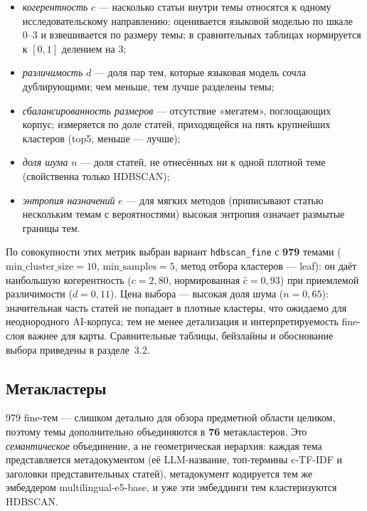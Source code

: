 \begin{itemize}
  \item \emph{когерентность} $c$ — насколько статьи внутри темы относятся к одному
        исследовательскому направлению; оценивается языковой моделью по шкале 0–3 и взвешивается
        по размеру темы; в сравнительных таблицах нормируется к $[0,1]$ делением на 3;
  \item \emph{различимость} $d$ — доля пар тем, которые языковая модель сочла дублирующими; чем
        меньше, тем лучше разделены темы;
  \item \emph{сбалансированность размеров} — отсутствие «мегатем», поглощающих корпус;
        измеряется по доле статей, приходящейся на пять крупнейших кластеров (top5, меньше — лучше);
  \item \emph{доля шума} $n$ — доля статей, не отнесённых ни к одной плотной теме (свойственна
        только HDBSCAN);
  \item \emph{энтропия назначений} $e$ — для мягких методов (приписывают статью нескольким темам
        с вероятностями) высокая энтропия означает размытые границы тем.
\end{itemize}

По совокупности этих метрик выбран вариант \texttt{hdbscan\_fine} с \textbf{979} темами
($\mathrm{min\_cluster\_size} = 10$, $\mathrm{min\_samples} = 5$, метод отбора кластеров — leaf):
он даёт наибольшую когерентность ($c = 2{,}80$, нормированная $\hat{c} = 0{,}93$) при приемлемой
различимости ($d = 0{,}11$). Цена выбора — высокая доля шума ($n = 0{,}65$): значительная часть
статей не попадает в плотные кластеры, что ожидаемо для неоднородного AI-корпуса; тем не менее
детализация и интерпретируемость fine-слоя важнее для карты. Сравнительные таблицы, бейзлайны
и обоснование выбора приведены в разделе~3.2.

\subsection{Метакластеры}
\label{sec:meta}

979 fine-тем — слишком детально для обзора предметной области целиком, поэтому темы дополнительно
объединяются в \textbf{76} метакластеров. Это \emph{семантическое} объединение, а не геометрическая
иерархия: каждая тема представляется метадокументом (её LLM-название, топ-термины c-TF-IDF и
заголовки представительных статей), метадокумент кодируется тем же эмбеддером
multilingual-e5-base, и уже эти эмбеддинги тем кластеризуются HDBSCAN.


